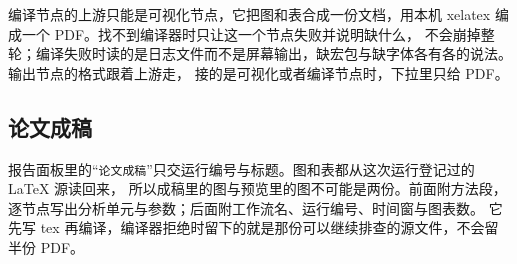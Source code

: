 编译节点的上游只能是可视化节点，它把图和表合成一份文档，用本机 xelatex 编成一个 PDF。找不到编译器时只让这一个节点失败并说明缺什么，
不会崩掉整轮；编译失败时读的是日志文件而不是屏幕输出，缺宏包与缺字体各有各的说法。输出节点的格式跟着上游走，
接的是可视化或者编译节点时，下拉里只给 PDF。

\subsection{论文成稿}

报告面板里的“\texttt{论文成稿}”只交运行编号与标题。图和表都从这次运行登记过的 LaTeX 源读回来，
所以成稿里的图与预览里的图不可能是两份。前面附方法段，逐节点写出分析单元与参数；后面附工作流名、运行编号、时间窗与图表数。
它先写 tex 再编译，编译器拒绝时留下的就是那份可以继续排查的源文件，不会留半份 PDF。
